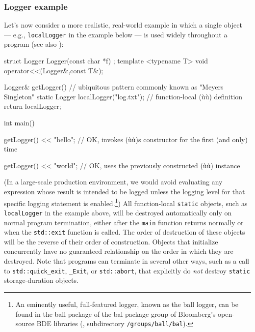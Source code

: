 \subsubsection[Logger example]{Logger example}\label{logger-example}

Let's now consider a more realistic,
real-world example in which a single object --- e.g.,
\lstinline!localLogger! in the example below --- is used widely throughout a program (see
also ):

\begin{emcppshiddenlisting}[emcppsbatch=e3]
struct Logger {
  Logger(const char *f) {}
};
template <typename T>
void operator<<(Logger&,const T&);
\end{emcppshiddenlisting}
\begin{emcppslisting}[emcppsbatch=e3]
Logger& getLogger()  // ubiquitous pattern commonly known as "Meyers Singleton"
{
    static Logger localLogger("log.txt");  // function-local (ù{}ù) definition
    return localLogger;
}

int main()
{
    getLogger() << "hello";
        // OK, invokes (ù{}ù)s constructor for the first (and only) time

    getLogger() << "world";
        // OK, uses the previously constructed (ù{}ù) instance
}
\end{emcppslisting}

\noindent (In a large-scale production environment, we would avoid evaluating any expression whose result is intended to be logged unless the logging level for that specific logging statement is enabled.{\cprotect\footnote{An eminently useful,
full-featured logger, known as the {ball} logger, can be found in the
{ball} package of the {bal} package group of Bloomberg's open-source
  BDE libraries (\cite{bde14}, subdirectory \texttt{/groups/ball/bal}).}}) All function-local \lstinline!static! objects, such as \lstinline!localLogger!
in the example above, will be destroyed automatically only on normal
program termination, either after the \lstinline!main! function returns
normally or when the \lstinline!std::exit! function is
called. The order of destruction
of these objects will be the reverse of their order of construction.
Objects that initialize concurrently have no guaranteed relationship on
the order in which they are destroyed. Note that programs can terminate in several other ways,
such as a call to \lstinline!std::quick_exit!, \lstinline!_Exit!, or
\lstinline!std::abort!, that explicitly do \emph{not} destroy
  \lstinline!static! storage-duration objects.

